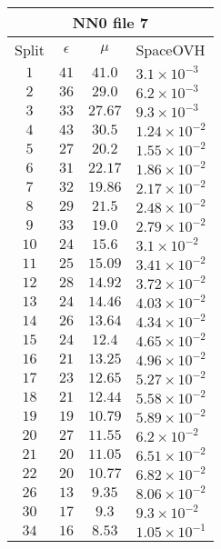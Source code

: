 \documentclass[]{article}
\begin{document}
		
		\vspace*{0.5 cm}
	\begin{table}
		\begin{tabular}{|c | c | c | l |}
			
			\multicolumn{4}{c}{NN0 file 7} \\
			\hline
			Split & $\epsilon$ & $\mu$ & SpaceOVH \\ \hline
			$1$ & $41$ & $41.0$ & $3.1\times 10^{-3}$ \\ 
			$2$ & $36$ & $29.0$ & $6.2\times 10^{-3}$ \\ 
			$3$ & $33$ & $27.67$ & $9.3\times 10^{-3}$ \\ 
			$4$ & $43$ & $30.5$ & $1.24\times 10^{-2}$ \\ 
			$5$ & $27$ & $20.2$ & $1.55\times 10^{-2}$ \\ 
			$6$ & $31$ & $22.17$ & $1.86\times 10^{-2}$ \\ 
			$7$ & $32$ & $19.86$ & $2.17\times 10^{-2}$ \\ 
			$8$ & $29$ & $21.5$ & $2.48\times 10^{-2}$ \\ 
			$9$ & $33$ & $19.0$ & $2.79\times 10^{-2}$ \\ 
			$10$ & $24$ & $15.6$ & $3.1\times 10^{-2}$ \\ 
			$11$ & $25$ & $15.09$ & $3.41\times 10^{-2}$ \\ 
			$12$ & $28$ & $14.92$ & $3.72\times 10^{-2}$ \\ 
			$13$ & $24$ & $14.46$ & $4.03\times 10^{-2}$ \\ 
			$14$ & $26$ & $13.64$ & $4.34\times 10^{-2}$ \\ 
			$15$ & $24$ & $12.4$ & $4.65\times 10^{-2}$ \\ 
			$16$ & $21$ & $13.25$ & $4.96\times 10^{-2}$ \\ 
			$17$ & $23$ & $12.65$ & $5.27\times 10^{-2}$ \\ 
			$18$ & $21$ & $12.44$ & $5.58\times 10^{-2}$ \\ 
			$19$ & $19$ & $10.79$ & $5.89\times 10^{-2}$ \\ 
			$20$ & $27$ & $11.55$ & $6.2\times 10^{-2}$ \\ 
			$21$ & $20$ & $11.05$ & $6.51\times 10^{-2}$ \\ 
			$22$ & $20$ & $10.77$ & $6.82\times 10^{-2}$ \\ 
			$26$ & $13$ & $9.35$ & $8.06\times 10^{-2}$ \\ 
			$30$ & $17$ & $9.3$ & $9.3\times 10^{-2}$ \\ 
			$34$ & $16$ & $8.53$ & $1.05\times 10^{-1}$ \\ 

\end{tabular}
\end{table}
\end{document}
